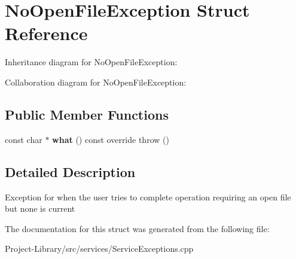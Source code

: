 \hypertarget{structNoOpenFileException}{}\section{No\+Open\+File\+Exception Struct Reference}
\label{structNoOpenFileException}


Inheritance diagram for No\+Open\+File\+Exception\+:


Collaboration diagram for No\+Open\+File\+Exception\+:
\subsection*{Public Member Functions}
\begin{DoxyCompactItemize}
\item 
\mbox{\label{structNoOpenFileException_a1a767f96661d700c46fcd896ba8bfd8b}} 
const char $\ast$ {\bfseries what} () const override  throw ()
\end{DoxyCompactItemize}


\subsection{Detailed Description}
Exception for when the user tries to complete operation requiring an open file but none is current 

The documentation for this struct was generated from the following file\+:\begin{DoxyCompactItemize}
\item 
Project-\/\+Library/src/services/Service\+Exceptions.\+cpp\end{DoxyCompactItemize}
